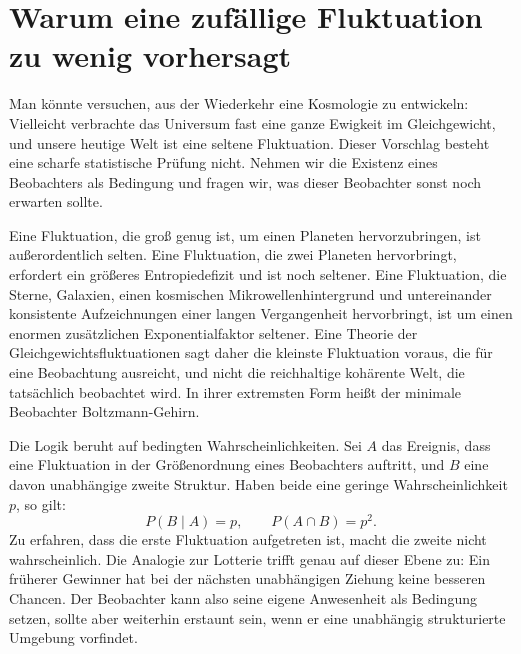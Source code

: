 \section{Warum eine zufällige Fluktuation zu wenig vorhersagt}

Man könnte versuchen, aus der Wiederkehr eine Kosmologie zu entwickeln: Vielleicht verbrachte das Universum fast eine ganze Ewigkeit im Gleichgewicht, und unsere heutige Welt ist eine seltene Fluktuation. Dieser Vorschlag besteht eine scharfe statistische Prüfung nicht. Nehmen wir die Existenz eines Beobachters als Bedingung und fragen wir, was dieser Beobachter sonst noch erwarten sollte.

Eine Fluktuation, die groß genug ist, um einen Planeten hervorzubringen, ist außerordentlich selten. Eine Fluktuation, die zwei Planeten hervorbringt, erfordert ein größeres Entropiedefizit und ist noch seltener. Eine Fluktuation, die Sterne, Galaxien, einen kosmischen Mikrowellenhintergrund und untereinander konsistente Aufzeichnungen einer langen Vergangenheit hervorbringt, ist um einen enormen zusätzlichen Exponentialfaktor seltener. Eine Theorie der Gleichgewichtsfluktuationen sagt daher die kleinste Fluktuation voraus, die für eine Beobachtung ausreicht, und nicht die reichhaltige kohärente Welt, die tatsächlich beobachtet wird. In ihrer extremsten Form heißt der minimale Beobachter Boltzmann-Gehirn.

Die Logik beruht auf bedingten Wahrscheinlichkeiten. Sei \(A\) das Ereignis, dass eine Fluktuation in der Größenordnung eines Beobachters auftritt, und \(B\) eine davon unabhängige zweite Struktur. Haben beide eine geringe Wahrscheinlichkeit \(p\), so gilt:
\begin{equation}
 P(B\mid A)=p,
 \qquad
 P(A\cap B)=p^2.
 \label{eq:sm8-conditional-fluctuations}
\end{equation}
Zu erfahren, dass die erste Fluktuation aufgetreten ist, macht die zweite nicht wahrscheinlich. Die Analogie zur Lotterie trifft genau auf dieser Ebene zu: Ein früherer Gewinner hat bei der nächsten unabhängigen Ziehung keine besseren Chancen. Der Beobachter kann also seine eigene Anwesenheit als Bedingung setzen, sollte aber weiterhin erstaunt sein, wenn er eine unabhängig strukturierte Umgebung vorfindet.

\begin{classroomqa}
\end{classroomqa}

